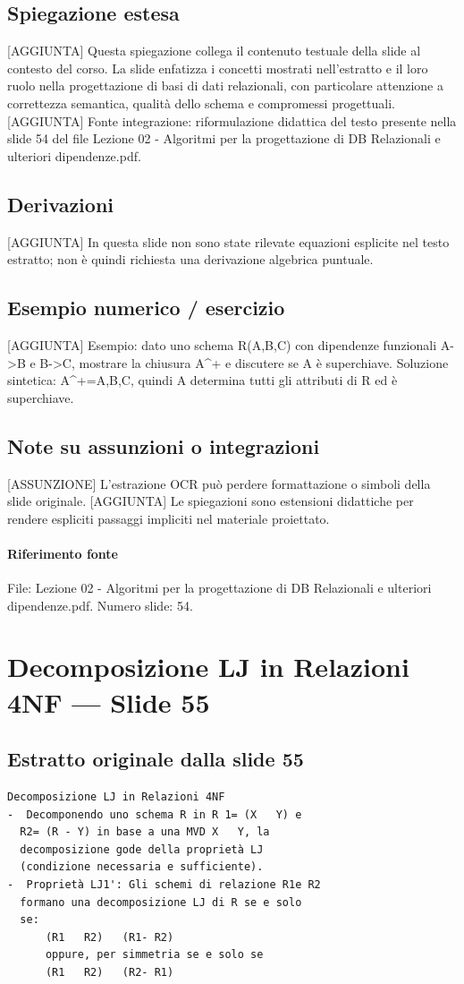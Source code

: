 \documentclass[11pt]{article}
\begin{document}
\subsection*{Spiegazione estesa}
[AGGIUNTA] Questa spiegazione collega il contenuto testuale della slide al contesto del corso. La slide enfatizza i concetti mostrati nell'estratto e il loro ruolo nella progettazione di basi di dati relazionali, con particolare attenzione a correttezza semantica, qualità dello schema e compromessi progettuali.
[AGGIUNTA] Fonte integrazione: riformulazione didattica del testo presente nella slide 54 del file Lezione 02 - Algoritmi per la progettazione di DB Relazionali e ulteriori dipendenze.pdf.
\subsection*{Derivazioni}
[AGGIUNTA] In questa slide non sono state rilevate equazioni esplicite nel testo estratto; non è quindi richiesta una derivazione algebrica puntuale.
\subsection*{Esempio numerico / esercizio}
[AGGIUNTA] Esempio: dato uno schema R(A,B,C) con dipendenze funzionali A->B e B->C, mostrare la chiusura A^+ e discutere se A è superchiave. Soluzione sintetica: A^+={A,B,C}, quindi A determina tutti gli attributi di R ed è superchiave.
\subsection*{Note su assunzioni o integrazioni}
[ASSUNZIONE] L'estrazione OCR può perdere formattazione o simboli della slide originale.
[AGGIUNTA] Le spiegazioni sono estensioni didattiche per rendere espliciti passaggi impliciti nel materiale proiettato.
\paragraph{Riferimento fonte} File: Lezione 02 - Algoritmi per la progettazione di DB Relazionali e ulteriori dipendenze.pdf. Numero slide: 54.
\section{Decomposizione LJ in Relazioni 4NF --- Slide 55}
\subsection*{Estratto originale dalla slide 55}
\begin{lstlisting}
Decomposizione LJ in Relazioni 4NF
-  Decomponendo uno schema R in R 1= (X   Y) e
  R2= (R - Y) in base a una MVD X   Y, la
  decomposizione gode della proprietà LJ
  (condizione necessaria e sufficiente).
-  Proprietà LJ1': Gli schemi di relazione R1e R2
  formano una decomposizione LJ di R se e solo
  se:
      (R1   R2)   (R1- R2)
      oppure, per simmetria se e solo se
      (R1   R2)   (R2- R1)
\end{lstlisting}
\end{document}
